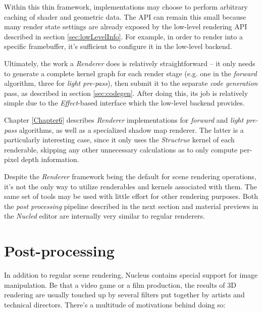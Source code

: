 Within this thin framework, implementations may choose to perform arbitrary caching of shader and geometric data. The API can remain this small because many render state settings are already exposed by the low-level rendering API described in section \ref{sec:lowLevelInfo}. For example, in order to render into a specific framebuffer, it's sufficient to configure it in the low-level backend.

Ultimately, the work a \emph{Renderer} does is relatively straightforward -- it only needs to generate a complete kernel graph for each render stage (e.g. one in the \emph{forward} algorithm, three for \emph{light pre-pass}), then submit it to the separate \emph{code generation} pass, as described in section \ref{sec:codegen}. After doing this, its job is relatively simple due to the \emph{Effect}-based interface which the low-level backend provides.

Chapter \ref{Chapter6} describes \emph{Renderer} implementations for \emph{forward} and \emph{light pre-pass} algorithms, as well as a specialized shadow map renderer. The latter is a particularly interesting case, since it only uses the \emph{Structrue} kernel of each renderable, skipping any other unnecessary calculations as to only compute per-pixel depth information.

Despite the \emph{Renderer} framework being the default for scene rendering operations, it's not the only way to utilize renderables and kernels associated with them. The same set of tools may be used with little effort for other rendering purposes. Both the \emph{post processing} pipeline described in the next section and material previews in the \emph{Nucled} editor are internally very similar to regular renderers.

\section{Post-processing}

In addition to regular scene rendering, Nucleus contains special support for image manipulation. Be that a video game or a film production, the results of 3D rendering are usually touched up by several filters put together by artists and technical directors. There's a multitude of motivations behind doing so:

